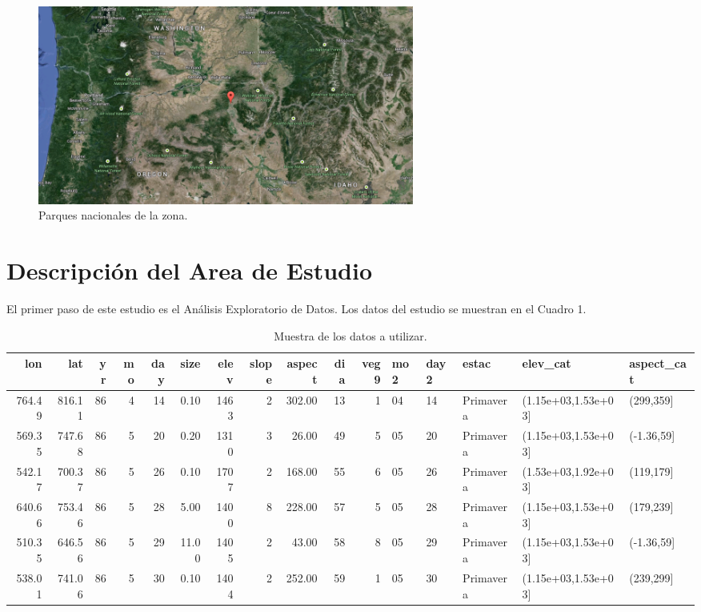 \documentclass[12,]{article}
\begin{document}
\begin{figure}[H]
\centering
\includegraphics[width=0.6\textwidth]{imagenes/blueM.png}
\caption{Parques nacionales de la zona.}

\end{figure}

\section{Descripción del Area de
Estudio}\label{descripcion-del-area-de-estudio}

El primer paso de este estudio es el Análisis Exploratorio de Datos. Los
datos del estudio se muestran en el Cuadro 1.

\begin{table}[H]
\centering
{\tiny
\begin{tabular}{rrrrrrrrrrrlllll}
  \hline
lon & lat & yr & mo & day & size & elev & slope & aspect & dia & veg9 & mo2 & day2 & estac & elev\_cat & aspect\_cat \\ 
  \hline
764.49 & 816.11 &  86 &   4 &  14 & 0.10 & 1463 &   2 & 302.00 &  13 &   1 & 04 & 14 & Primavera & (1.15e+03,1.53e+03] & (299,359] \\ 
  569.35 & 747.68 &  86 &   5 &  20 & 0.20 & 1310 &   3 & 26.00 &  49 &   5 & 05 & 20 & Primavera & (1.15e+03,1.53e+03] & (-1.36,59] \\ 
  542.17 & 700.37 &  86 &   5 &  26 & 0.10 & 1707 &   2 & 168.00 &  55 &   6 & 05 & 26 & Primavera & (1.53e+03,1.92e+03] & (119,179] \\ 
  640.66 & 753.46 &  86 &   5 &  28 & 5.00 & 1400 &   8 & 228.00 &  57 &   5 & 05 & 28 & Primavera & (1.15e+03,1.53e+03] & (179,239] \\ 
  510.35 & 646.56 &  86 &   5 &  29 & 11.00 & 1405 &   2 & 43.00 &  58 &   8 & 05 & 29 & Primavera & (1.15e+03,1.53e+03] & (-1.36,59] \\ 
  538.01 & 741.06 &  86 &   5 &  30 & 0.10 & 1404 &   2 & 252.00 &  59 &   1 & 05 & 30 & Primavera & (1.15e+03,1.53e+03] & (239,299] \\ 
   \hline
\end{tabular}
}
\caption{Muestra de los datos a utilizar.} 
\end{table}
\end{document}
